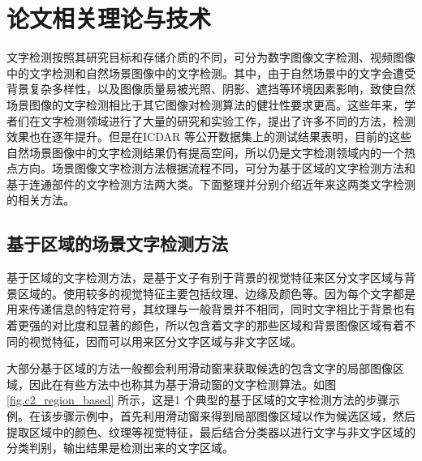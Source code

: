 ﻿%
%
%
%
%
%

\chapter{论文相关理论与技术}

    文字检测按照其研究目标和存储介质的不同，可分为数字图像文字检测、视频图像中的文字检测和自然场景图像中的文字检测。其中，由于自然场景中的文字会遭受背景复杂多样性，以及图像质量易被光照、阴影、遮挡等环境因素影响，致使自然场景图像的文字检测相比于其它图像对检测算法的健壮性要求更高。这些年来，学者们在文字检测领域进行了大量的研究和实验工作，提出了许多不同的方法，检测效果也在逐年提升。但是在ICDAR 等公开数据集上的测试结果表明，目前的这些自然场景图像中的文字检测结果仍有提高空间，所以仍是文字检测领域内的一个热点方向。场景图像文字检测方法根据流程不同，可分为基于区域的文字检测方法和基于连通部件的文字检测方法两大类。下面整理并分别介绍近年来这两类文字检测的相关方法。

    \section{基于区域的场景文字检测方法}

    基于区域的文字检测方法，是基于文子有别于背景的视觉特征来区分文字区域与背景区域的。使用较多的视觉特征主要包括纹理、边缘及颜色等。因为每个文字都是用来传递信息的特定符号，其纹理与一般背景并不相同，同时文字相比于背景也有着更强的对比度和显著的颜色，所以包含着文字的那些区域和背景图像区域有着不同的视觉特征，因而可以用来区分文字区域与非文字区域。

    大部分基于区域的方法一般都会利用滑动窗来获取候选的包含文字的局部图像区域，因此在有些方法中也称其为基于滑动窗的文字检测算法。如图\ref{fig.c2_region_based} 所示，这是1 个典型的基于区域的文字检测方法的步骤示例。在该步骤示例中，首先利用滑动窗来得到局部图像区域以作为候选区域，然后提取区域中的颜色、纹理等视觉特征，最后结合分类器以进行文字与非文字区域的分类判别，输出结果是检测出来的文字区域。


